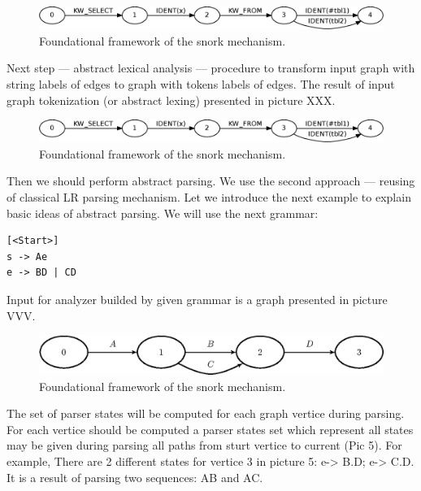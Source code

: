 \documentclass{sigplanconf}
\begin{document}
\begin{figure}
    \begin{center}
        \includegraphics[scale=0.3]{Graphs/simple_sql.eps}
    \end{center}
    \caption{Foundational framework of the snork mechanism.}
    \label{fig-ffsm}
\end{figure}

Next step — abstract lexical analysis — procedure to transform input graph with string labels of edges to graph with tokens labels of edges. The result of input graph tokenization (or abstract lexing) presented in picture XXX. 

\begin{figure}
    \begin{center}
        \includegraphics[scale=0.3]{Graphs/simple_sql.eps}
    \end{center}
    \caption{Foundational framework of the snork mechanism.}
    \label{fig-ffsm}
\end{figure}

Then we should perform abstract parsing. We use the second approach — reusing of classical LR parsing mechanism. Let we introduce the next example to explain basic ideas of abstract parsing. We will use the next grammar:

\begin{verbatim}
[<Start>]
s -> Ae
e -> BD | CD
\end{verbatim}

Input for analyzer builded by given grammar is a graph presented in picture VVV.

\begin{figure}
    \begin{center}
        \includegraphics[scale=0.5]{Graphs/simple_grammar_input.eps}
    \end{center}
    \caption{Foundational framework of the snork mechanism.}
    \label{fig-ffsm}
\end{figure}

The set of parser states will be computed for each graph vertice during parsing. For each vertice should be computed a parser states set which represent all states may be given during parsing all paths from sturt vertice to current (Pic 5). For example, There are 2 different states for vertice 3 in picture 5: {e-> B.D; e-> C.D}. It is a result of parsing two sequences: AB and AC. 
\end{document}
